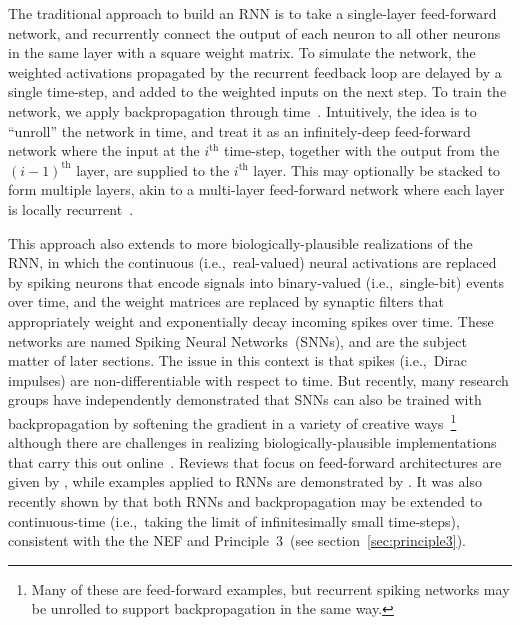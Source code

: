 The traditional approach to build an RNN is to take a single-layer feed-forward network, and recurrently connect the output of each neuron to all other neurons in the same layer with a square weight matrix.
To simulate the network, the weighted activations propagated by the recurrent feedback loop are delayed by a single time-step, and added to the weighted inputs on the next step.
To train the network, we apply backpropagation through time~\citep[BPTT;][]{werbos1990backpropagation}.
Intuitively, the idea is to ``unroll'' the network in time, and treat it as an infinitely-deep feed-forward network where the input at the $i^\text{th}$ time-step, together with the output from the $(i-1)^\text{th}$ layer, are supplied to the $i^\text{th}$ layer.
This may optionally be stacked to form multiple layers, akin to a multi-layer feed-forward network where each layer is locally recurrent~\citep{pascanu2013construct}.

This approach also extends to more biologically-plausible realizations of the RNN, in which the continuous (i.e.,~real-valued) neural activations are replaced by spiking neurons that encode signals into binary-valued (i.e.,~single-bit) events over time, and the weight matrices are replaced by synaptic filters that appropriately weight and exponentially decay incoming spikes over time.
These networks are named Spiking Neural Networks~(SNNs), and are the subject matter of later sections.
The issue in this context is that spikes (i.e.,~Dirac impulses) are non-differentiable with respect to time.
But recently, many research groups have independently demonstrated that SNNs can also be trained with backpropagation by softening the gradient in a variety of creative ways~\citep{esser2015backpropagation, hunsberger2015spiking, hunsberger2016training, lee2016training, marblestone2016toward, neftci2017neuromorphic, bellec2018long, hunsberger2018, huh2018gradient, severa2018whetstone, rasmussen2018nengodl, shrestha2018slayer, neftci2019surrogate}\footnote{%
Many of these are feed-forward examples, but recurrent spiking networks may be unrolled to support backpropagation in the same way.}
although there are challenges in realizing biologically-plausible implementations that carry this out online~\citep[][submitted]{hunsberger2018, stockel2019align}.
Reviews that focus on feed-forward architectures are given by \citet{pfeiffer2018deep, tavanaei2018deep}, while examples applied to RNNs are demonstrated by \citet{diehl2016conversion, huh2018gradient}.
It was also recently shown by \citet{chen2018neural} that both RNNs and backpropagation may be extended to continuous-time (i.e.,~taking the limit of infinitesimally small time-steps), consistent with the the NEF and Principle~3~(see section~\ref{sec:principle3}).
 

